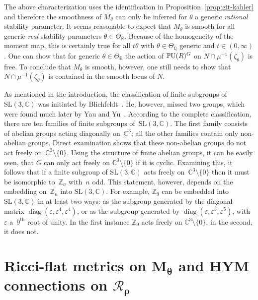 \documentclass[pdftex]{sigma}
\numberwithin{equation}{section}
\newcommand{\cR}{\mathcal{R}}
\newcommand{\Z}{{\mathbb Z}}
\newcommand{\Q}{{\mathbb Q}}
\newcommand{\R}{{\mathbb R}}
\newcommand{\C}{{\mathbb C}}
\newcommand{\SL}{\mathrm{SL}}
\newcommand{\PU}{{\mathbb P}{\rm U}}
\renewcommand{\epsilon}{\varepsilon}
\begin{document}
\begin{Remark}
  The above characterization uses the identif\/ication in
  Proposition~\ref{prop:git-kahler} and therefore the smoothness of
  $M_{\theta}$ can only be inferred for $\theta$ a generic {\em
    rational} stability parameter.  It seems reasonable to expect that
  $M_\theta$ is smooth for all generic \emph{real} stability
  parameters $\theta \in \Theta_\R$.  Because of the homogeneity of
  the moment map, this is certainly true for all $t\theta$ with
  $\theta \in \Theta_{\Q}$ generic and $t\in(0,\infty)$.  One can show
  that for generic $\theta\in\Theta_\R$ the action of $\PU(R)^G$ on
  $N \cap \mu^{-1}(\zeta_\theta)$ is free.  To conclude that
  $M_{\theta}$ is smooth, however, one still needs to show that
  $N\cap \mu^{-1}(\zeta_\theta)$ is contained in the smooth locus of
  $N$.
\end{Remark}

\begin{Remark}\label{rem:fg}
  As mentioned in the introduction, the classif\/ication of f\/inite subgroups of $\SL(3,\C)$ was initiated by  Blichfeldt~\cite{Blichfeldt1917}. He, however, missed two groups, which were found much later by Yau and Yu~\cite{Yau-Stephan1993}.  According to the complete classif\/ication, there are ten families of f\/inite subgroups of~$\SL(3,\C)$.  The f\/irst family consists of abelian groups acting diagonally on~$\C^3$; all the other families contain only non-abelian groups. Direct examination shows that these
non-abelian groups do not act freely on~$\C^3{\setminus} \{0\}$. Using the structure of f\/inite abelian groups, it can be easily seen, that
$G$ can only act freely on $\C^3{\setminus} \{0\}$ if it is cyclic. Examining this, it follows that if a f\/inite subgroup of
$\SL(3,\C)$ acts freely on~$\C^3{\setminus} \{0\}$ then it must be isomorphic to~$\Z_n$ with~$n$ odd.
This statement, however, depends on the embedding on~$\Z_n$ into $\SL(3, \C)$. For example, $\Z_9$ can be embedded into $\SL(3,\C)$ in at least two ways: as the subgroup generated by the diagonal matrix $\operatorname{diag}(\epsilon,\epsilon^4, \epsilon^4)$, or as the subgroup generated by $\operatorname{diag}(\epsilon, \epsilon^3, \epsilon^5)$, with~$\epsilon$ a~$9^{\text{th}}$ root of unity. In the f\/irst instance $\Z_9$ acts freely on $\C^3{\setminus} \{0\}$, in the second, it does not.
\end{Remark}

\section[Ricci-f\/lat metrics on $M_\theta$ and HYM connections on $\cR_{\rho}$]{Ricci-f\/lat metrics on $\boldsymbol{M_\theta}$ and HYM connections on $\boldsymbol{\cR_{\rho}}$}
\label{sec:RFHYM}
\end{document}
